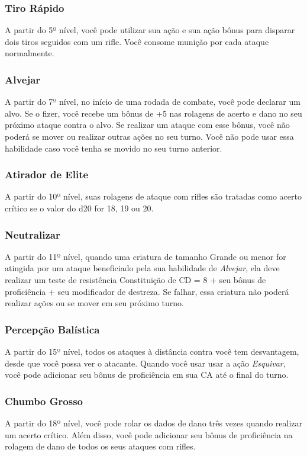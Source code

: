 \documentclass[letterpaper,twocolumn,openany]{dndbook}
\begin{document}
	\subsubsection{Tiro Rápido}
	A partir do 5º nível, você pode utilizar sua ação e sua ação bônus para disparar dois tiros seguidos com um rifle. Você consome munição por cada ataque normalmente.
	
	\subsubsection{Alvejar}
	A partir do 7º nível, no início de uma rodada de combate, você pode declarar um alvo. Se o fizer, você recebe um bônus de +5 nas rolagens de acerto e dano no seu próximo ataque contra o alvo. Se realizar um ataque com esse bônus, você não poderá se mover ou realizar outras ações no seu turno. Você não pode usar essa habilidade caso você tenha se movido no seu turno anterior.
	
	\subsubsection{Atirador de Elite}
	A partir do 10º nível, suas rolagens de ataque com rifles são tratadas como acerto crítico se o valor do d20 for 18, 19 ou 20.
	
	\subsubsection{Neutralizar}
	A partir do 11º nível, quando uma criatura de tamanho Grande ou menor for atingida por um ataque beneficiado pela sua habilidade de \textit{Alvejar}, ela deve realizar um teste de resistência Constituição de CD = 8 + seu bônus de proficiência + seu modificador de destreza. Se falhar, essa criatura não poderá realizar ações ou se mover em seu próximo turno.
	
	\subsubsection{Percepção Balística}
	A partir do 15º nível, todos os ataques à distância contra você tem desvantagem, desde que você possa ver o atacante. Quando você usar usar a ação \textit{Esquivar}, você pode adicionar seu bônus de proficiência em sua CA até o final do turno.
	
	\subsubsection{Chumbo Grosso}
	A partir do 18º nível, você pode rolar os dados de dano três vezes quando realizar um acerto crítico. Além disso, você pode adicionar seu bônus de proficiência na rolagem de dano de todos os seus ataques com rifles.
	
\end{document}
